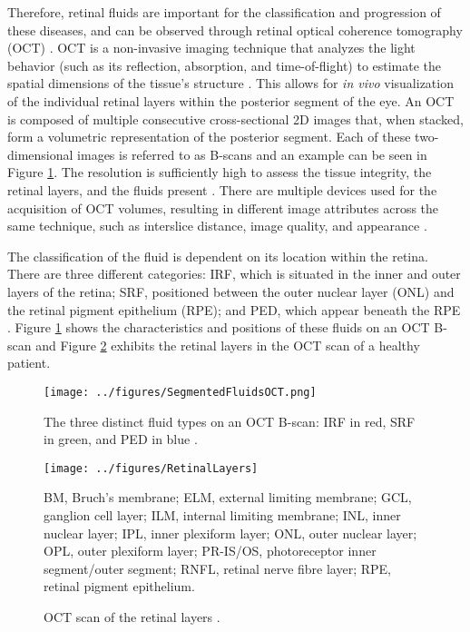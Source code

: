 Therefore, retinal fluids are important for the classification and progression of these diseases, and can be observed through retinal optical coherence tomography (OCT) \parencite{Bogunovic2019a}. OCT is a non-invasive imaging technique that analyzes the light behavior (such as its reflection, absorption, and time-of-flight) to estimate the spatial dimensions of the tissue's structure \parencite{Huang1991}. This allows for \textit{in vivo} visualization of the individual retinal layers within the posterior segment of the eye. An OCT is composed of multiple consecutive cross-sectional 2D images that, when stacked, form a volumetric representation of the posterior segment. Each of these two-dimensional images is referred to as B-scans and an example can be seen in Figure \ref{fig:SegmentedFluidsOCT}. The resolution is sufficiently high to assess the tissue integrity, the retinal layers, and the fluids present \parencite{Drexler2008, Viedma2022}. There are multiple devices used for the acquisition of OCT volumes, resulting in different image attributes across the same technique, such as interslice distance, image quality, and appearance \parencite{Bogunovic2019a}. 
\par
The classification of the fluid is dependent on its location within the retina. There are three different categories: IRF, which is situated in the inner and outer layers of the retina; SRF, positioned between the outer nuclear layer (ONL) and the retinal pigment epithelium (RPE); and PED, which appear beneath the RPE \parencite{Bogunovic2019a}. Figure \ref{fig:SegmentedFluidsOCT} shows the characteristics and positions of these fluids on an OCT B-scan and Figure \ref{fig:RetinalLayers} exhibits the retinal layers in the OCT scan of a healthy patient.
\par
\begin{figure}[!ht]
	\centering
	\texttt{[image: ../figures/SegmentedFluidsOCT.png]}
	\caption{The three distinct fluid types on an OCT B-scan: IRF in red, SRF in green, and PED in blue \cite{Bogunovic2019a}.}
	\label{fig:SegmentedFluidsOCT}
\end{figure}
\begin{figure}[!ht]
	\centering
	\texttt{[image: ../figures/RetinalLayers]}
	\caption{OCT scan of the retinal layers \cite{Almonte2020}.}
	\label{fig:RetinalLayers}
	\footnotesize
	\justifying
	BM, Bruch's membrane; ELM, external limiting membrane; GCL, ganglion cell layer; ILM, internal limiting membrane; INL, inner nuclear layer; IPL, inner plexiform layer; ONL, outer nuclear layer; OPL, outer plexiform layer; PR-IS/OS, photoreceptor inner segment/outer segment; RNFL, retinal nerve fibre layer; RPE, retinal pigment epithelium.
\end{figure}
